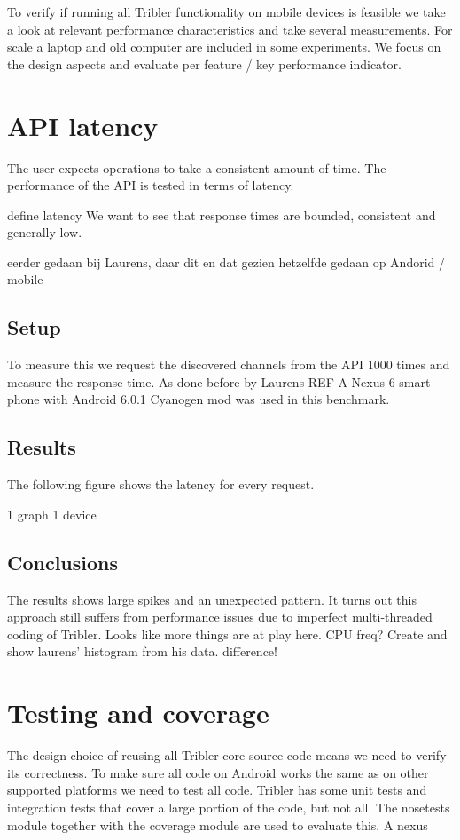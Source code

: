 
To verify if running all Tribler functionality on mobile devices is feasible we take a look at relevant performance characteristics and take several measurements.
For scale a laptop and old computer are included in some experiments.
We focus on the design aspects and evaluate per feature / key performance indicator.




\section{API latency}
The user expects operations to take a consistent amount of time.
The performance of the API is tested in terms of latency.

define latency
We want to see that response times are bounded, consistent and generally low.

eerder gedaan bij Laurens, daar dit en dat gezien
hetzelfde gedaan op Andorid / mobile

\subsection{Setup}
To measure this we request the discovered channels from the API 1000 times and measure the response time. As done before by Laurens REF
A Nexus 6 smart-phone with Android 6.0.1 Cyanogen mod was used in this benchmark.

\subsection{Results}
The following figure shows the latency for every request.

1 graph
1 device

\subsection{Conclusions}
The results shows large spikes and an unexpected pattern.
It turns out this approach still suffers from performance issues due to imperfect multi-threaded coding of Tribler.
Looks like more things are at play here.
CPU freq?
Create and show laurens' histogram from his data. difference!


\section{Testing and coverage}
The design choice of reusing all Tribler core source code means we need to verify its correctness.
To make sure all code on Android works the same as on other supported platforms we need to test all code.
Tribler has some unit tests and integration tests that cover a large portion of the code, but not all.
The nosetests module together with the coverage module are used to evaluate this.
A nexus 

